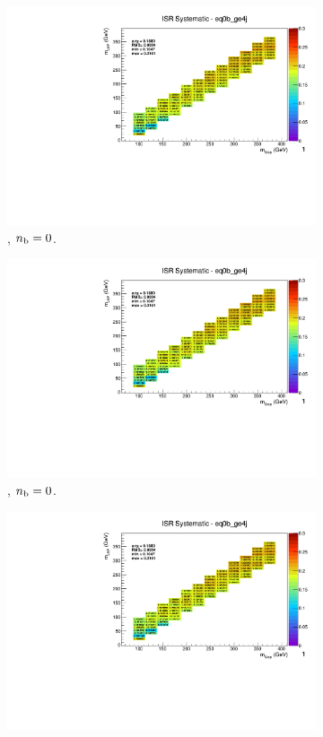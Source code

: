 \begin{figure}[ht!]
\begin{subfigure}[b]{0.32\textwidth}
    \includegraphics[width=\textwidth, page=12]{Figs/sms/t2degen/v19_2/systs/T2_4body_ISR_eq0b_ge4j.pdf}
    \caption{\njhigh, $n_{\text{b}} = 0$.}
  \end{subfigure}
  \begin{subfigure}[b]{0.32\textwidth}
    \includegraphics[width=\textwidth, page=8]{Figs/sms/t2degen/v19_2/systs/T2_4body_ISR_eq0b_ge4j.pdf}
    \caption{\njhigh, $n_{\text{b}} = 0$.}
  \end{subfigure}
  \begin{subfigure}[b]{0.32\textwidth}
    \includegraphics[width=\textwidth, page=1]{Figs/sms/t2degen/v19_2/systs/T2_4body_ISR_eq0b_ge4j.pdf}

\end{subfigure}
\end{figure}
